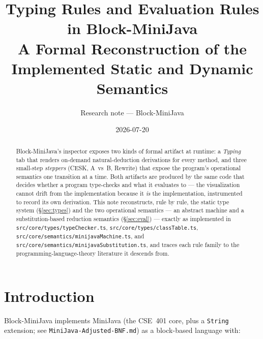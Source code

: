 \documentclass[11pt]{article}
\title{Typing Rules and Evaluation Rules in Block-MiniJava\\
\large A Formal Reconstruction of the Implemented Static and Dynamic Semantics}
\author{Research note --- Block-MiniJava}
\date{2026-07-20}
\begin{document}
\maketitle

\begin{abstract}
Block-MiniJava's inspector exposes two kinds of formal artifact at runtime: a
\emph{Typing} tab that renders on-demand natural-deduction derivations for
every method, and three small-step \emph{steppers} (CESK, A~vs~B, Rewrite)
that expose the program's operational semantics one transition at a time.
Both artifacts are produced by the same code that decides whether a program
type-checks and what it evaluates to --- the visualization cannot drift from
the implementation because it \emph{is} the implementation, instrumented to
record its own derivation. This note reconstructs, rule by rule, the static
type system (\S\ref{sec:types}) and the two operational semantics --- an
abstract machine and a substitution-based reduction semantics
(\S\ref{sec:eval}) --- exactly as implemented in
\texttt{src/core/types/typeChecker.ts}, \texttt{src/core/types/classTable.ts},
\texttt{src/core/semantics/minijavaMachine.ts}, and
\texttt{src/core/semantics/minijavaSubstitution.ts}, and traces each rule
family to the programming-language-theory literature it descends from.
\end{abstract}

\tableofcontents

\section{Introduction}

Block-MiniJava implements MiniJava (the CSE~401 core, plus a \texttt{String}
extension; see \texttt{MiniJava-Adjusted-BNF.md}) as a block-based language
with:
\end{document}
